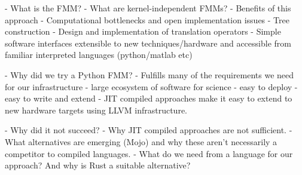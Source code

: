 

- What is the FMM?
- What are kernel-independent FMMs?
    - Benefits of this approach
    - Computational bottlenecks and open implementation issues
        - Tree construction
        - Design and implementation of translation operators
        - Simple software interfaces extensible to new techniques/hardware and accessible from familiar interpreted languages (python/matlab etc)

- Why did we try a Python FMM?
    - Fulfills many of the requirements we need for our infrastructure
    - large ecosystem of software for science
    - easy to deploy
    - easy to write and extend
    - JIT compiled approaches make it easy to extend to new hardware targets using LLVM infrastructure.

- Why did it not succeed?
    - Why JIT compiled approaches are not sufficient.    
    - What alternatives are emerging (Mojo) and why these aren't necessarily a competitor to compiled languages.
    - What do we need from a language for our approach? And why is Rust a suitable alternative? 
